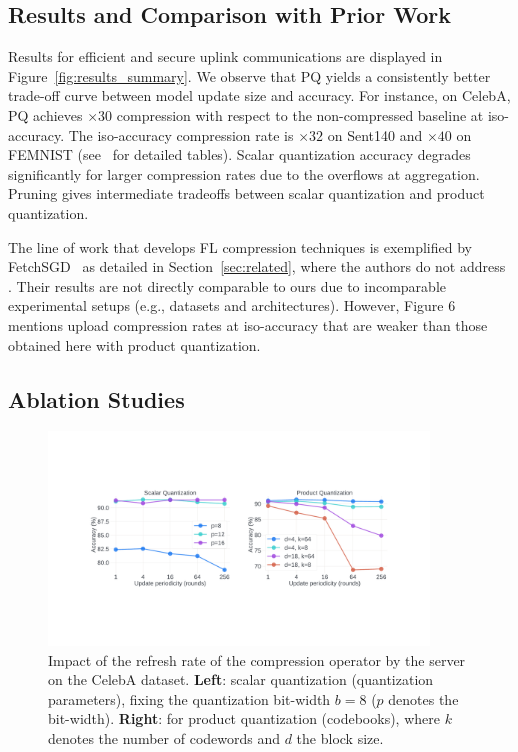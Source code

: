 \subsection{Results and Comparison with Prior Work}

Results for efficient and secure uplink communications are displayed in Figure~\ref{fig:results_summary}. 
We observe that PQ yields a consistently better trade-off curve between model update size and accuracy. For instance, on CelebA, PQ achieves $\times 30$ compression with respect to the non-compressed baseline at iso-accuracy. The iso-accuracy compression rate is $\times 32$ on Sent140 and $\times 40$ on FEMNIST (see~\cite{techreport} for detailed tables). 
Scalar quantization accuracy degrades significantly for larger compression rates due to the overflows at aggregation.
Pruning gives intermediate tradeoffs between scalar quantization and product quantization.

The line of work that develops FL compression techniques is exemplified by FetchSGD~\citep{rothchild2020fetchsgd} as detailed in Section~\ref{sec:related}, where the authors do not address \SecAgg. 
Their results are not directly comparable to ours due to incomparable experimental setups (e.g., datasets and architectures). 
However, Figure 6~\cite[Appendix A]{rothchild2020fetchsgd} mentions upload compression rates at iso-accuracy that are weaker than those obtained here with product quantization.

\subsection{Ablation Studies}
\label{subsec:ablations}

\begin{figure}[t]
    \label{mask-refresh}
    \centering
    \includegraphics[width=0.9\textwidth]{figs/refresh.pdf}
    \caption{\label{fig:refresh}
    Impact of the refresh rate of the compression operator by the server on the CelebA dataset. \textbf{Left}:  scalar quantization (quantization parameters), fixing the quantization bit-width $b=8$ ($p$ denotes the \SecAgg bit-width). \textbf{Right}: for product quantization (codebooks), where $k$ denotes the number of codewords and $d$ the block size.}
    \vspace{-3mm}
\end{figure}


